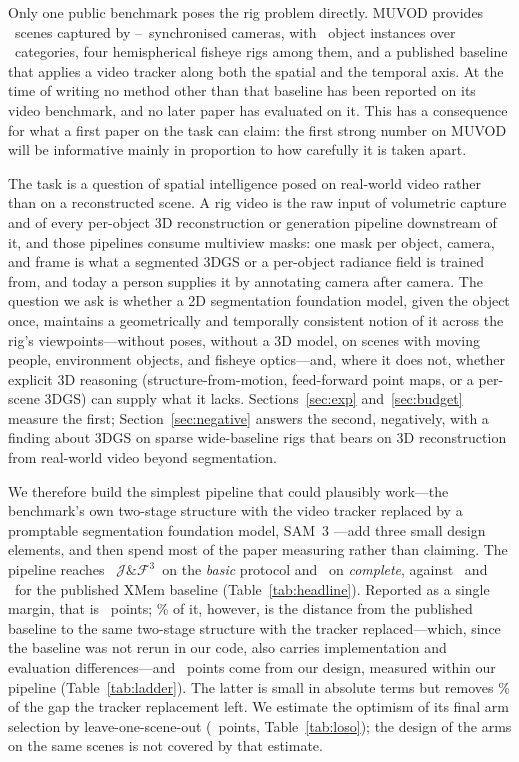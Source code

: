\documentclass[journal]{IEEEtran}
\newcommand{\JF}{\ensuremath{\mathcal{J}\&\mathcal{F}^{3}}}
\begin{document}
Only one public benchmark poses the rig problem directly. MUVOD \cite{muvod}
provides \nScenes\ scenes captured by \nCamMin--\nCamMax\ synchronised
cameras, with \nInstances\ object instances over \nCategories\ categories,
four hemispherical fisheye rigs among them, and a published baseline that
applies a video tracker along both the spatial and the temporal axis. At the
time of writing no method other than that baseline has been reported on its
video benchmark, and no later paper has evaluated on it. This has a
consequence for what a first paper on the task can claim: the first strong
number on MUVOD will be informative mainly in proportion to how carefully it is
taken apart.

The task is a question of spatial intelligence posed on real-world video
rather than on a reconstructed scene.
A rig video is the raw input of volumetric capture and of every per-object 3D
reconstruction or generation pipeline downstream of it, and those pipelines
consume multiview masks: one mask per object, camera, and frame is what a
segmented 3DGS or a per-object radiance field is trained from, and today a
person supplies it by annotating camera after camera. The question we ask is
whether a 2D segmentation foundation model, given the object once, maintains a
geometrically and temporally consistent notion of it across the rig's
viewpoints---without poses, without a 3D model, on scenes with moving people,
environment objects, and fisheye optics---and, where it does not, whether
explicit 3D reasoning (structure-from-motion, feed-forward point maps, or a
per-scene 3DGS) can supply what it lacks. Sections~\ref{sec:exp}
and~\ref{sec:budget} measure the first; Section~\ref{sec:negative} answers the
second, negatively, with a finding about 3DGS on sparse wide-baseline rigs that
bears on 3D reconstruction from real-world video beyond segmentation.

We therefore build the simplest pipeline that could plausibly work---the
benchmark's own two-stage structure with the video tracker replaced by a
promptable segmentation foundation model, SAM~3 \cite{sam3}---add three small
design elements, and then spend most of the paper measuring rather than
claiming. The pipeline reaches \OursBasic\ \JF\ on the \emph{basic} protocol
and \OursComplete\ on \emph{complete}, against \XMemBasic\ and \XMemComplete\
for the published XMem baseline (Table~\ref{tab:headline}). Reported as a single margin, that is \DeltaBasic\ points; \pctFoundation\% of
it, however, is the distance from the published baseline to the same two-stage
structure with the tracker replaced---which, since the baseline was not rerun
in our code, also carries implementation and evaluation differences---and
\gainOurs\ points come from our design, measured within our pipeline
(Table~\ref{tab:ladder}). The
latter is small in absolute terms but removes \gainOursPctGap\% of the gap the
tracker replacement left. We estimate the optimism of its final arm selection
by leave-one-scene-out (\losoOmega\ points, Table~\ref{tab:loso}); the design
of the arms on the same scenes is not covered by that estimate.
\end{document}

